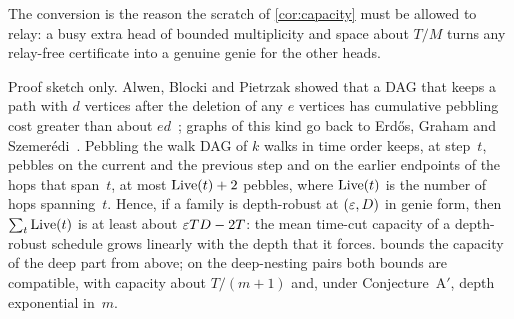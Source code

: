 The conversion is the reason the scratch of \cref{cor:capacity} must be allowed to relay: a busy extra head of bounded
multiplicity and space about $T/M$ turns any relay-free certificate into a genuine genie for the other heads.

\begin{remark}\label{rem:abp}
Proof sketch only. Alwen, Blocki and Pietrzak showed that a DAG that keeps a path with $d$ vertices after the deletion of
any $e$ vertices has cumulative pebbling cost greater than about $ed$~\cite{ABP2017}; graphs of this kind go back to Erdős,
Graham and Szemerédi~\cite{EGS1975}. Pebbling the walk DAG of $k$ walks in time order keeps, at step~$t$, pebbles on the
current and the previous step and on the earlier endpoints of the hops that span~$t$, at most $\mathrm{Live}(t)+2$ pebbles, where
$\mathrm{Live}(t)$ is the number of hops spanning~$t$. Hence, if a family is depth-robust at $(\varepsilon,D)$ in genie form, then
$\sum_t\mathrm{Live}(t)$ is at least about $\varepsilon TD-2T$: the mean time-cut capacity of a depth-robust schedule grows linearly with
the depth that it forces.  bounds the capacity of the deep part from above; on the deep-nesting pairs
both bounds are compatible, with capacity about $T/(m+1)$ and, under Conjecture~A$'$, depth exponential in~$m$.
\end{remark}
